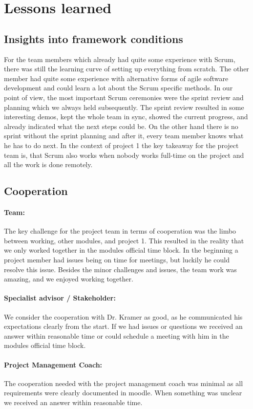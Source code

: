 \section{Lessons learned}\label{sec:lessons-learned}

\subsection{Insights into framework conditions}\label{subsec:insights-into-framework-conditions}
For the team members which already had quite some experience with Scrum,
there was still the learning curve of setting up everything from scratch.
The other member had quite some experience with alternative forms of agile software development and could learn a lot about the Scrum specific methods.
In our point of view, the most important Scrum ceremonies were the sprint review and planning
which we always held subsequently.
The sprint review resulted in some interesting demos, kept the whole team in sync, showed the current progress, and
already indicated what the next steps could be.
On the other hand there is no sprint without the sprint planning and after it, every team member knows what he has to do next.
In the context of project 1 the key takeaway for the project team is, that Scrum also works when nobody works full-time
on the project and all the work is done remotely.

\subsection{Cooperation}\label{subsec:cooperation}
\paragraph{Team:}
The key challenge for the project team in terms of cooperation was the limbo between working, other modules, and project 1.
This resulted in the reality that we only worked together in the modules official time block.
In the beginning a project member had issues being on time for meetings, but luckily he could resolve this issue.
Besides the minor challenges and issues, the team work was amazing, and we enjoyed working together.

\paragraph{Specialist advisor / Stakeholder:}
We consider the cooperation with Dr. Kramer as good, as he communicated his expectations clearly from the start.
If we had issues or questions we received an answer within reasonable time or could schedule a meeting with him in the
modules official time block.

\paragraph{Project Management Coach:}
The cooperation needed with the project management coach was minimal as all requirements were clearly documented in moodle.
When something was unclear we received an answer within reasonable time.
